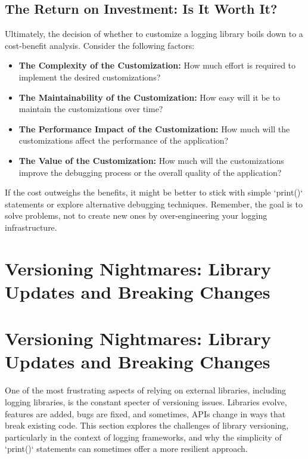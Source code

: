\documentclass{article}
\begin{document}
{{{{\subsection*{The Return on Investment: Is It Worth It?}

Ultimately, the decision of whether to customize a logging library boils down to a cost-benefit analysis. Consider the following factors:

\begin{itemize}
    \item \textbf{The Complexity of the Customization:} How much effort is required to implement the desired customizations?
    \item \textbf{The Maintainability of the Customization:} How easy will it be to maintain the customizations over time?
    \item \textbf{The Performance Impact of the Customization:} How much will the customizations affect the performance of the application?
    \item \textbf{The Value of the Customization:} How much will the customizations improve the debugging process or the overall quality of the application?
\end{itemize}

If the cost outweighs the benefits, it might be better to stick with simple `print()` statements or explore alternative debugging techniques. Remember, the goal is to solve problems, not to create new ones by over-engineering your logging infrastructure.

\newpage

\section*{Versioning Nightmares: Library Updates and Breaking Changes} %
\label{chapter-7-9-Versioning_Nightmares__Library_Updates_a}

\section*{Versioning Nightmares: Library Updates and Breaking Changes}

One of the most frustrating aspects of relying on external libraries, including logging libraries, is the constant specter of versioning issues. Libraries evolve, features are added, bugs are fixed, and sometimes, APIs change in ways that break existing code. This section explores the challenges of library versioning, particularly in the context of logging frameworks, and why the simplicity of `print()` statements can sometimes offer a more resilient approach.

}}}}
\end{document}
